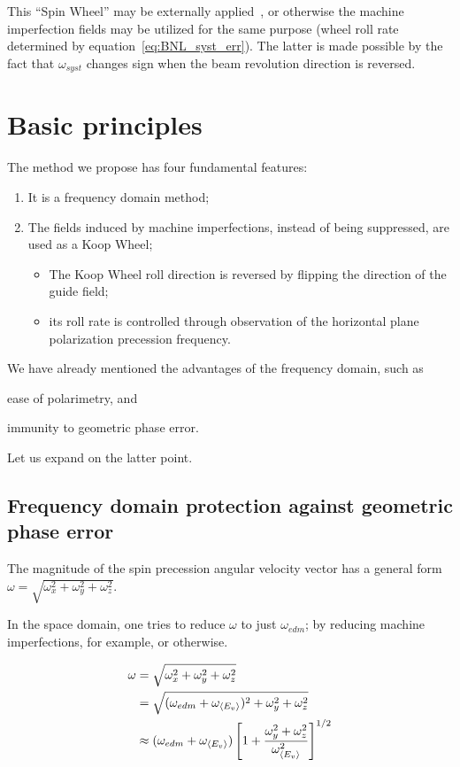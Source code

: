 \documentclass[a4paper]{jacow}
\newcommand{\w}{\omega}
\newcommand{\avg}[1]{\langle{#1}\rangle}
\newcommand{\wedm}{\w_{edm}}
\newcommand{\wimp}{\w_{\avg{E_v}}}
\begin{document}
This ``Spin Wheel'' may be externally applied~\cite{Koop:SW}, or otherwise the machine imperfection fields
may be utilized for the same purpose (wheel roll rate determined by equation~\eqref{eq:BNL_syst_err}).
The latter is made possible by the fact that $\w_{syst}$ changes sign when the beam revolution direction
is reversed.~\cite[p.~11]{BNL:Deuteron2008}

\section{Basic principles}

The method we propose has four fundamental features:
\begin{enumerate}
\item It is a frequency domain method;
\item The fields induced by machine imperfections, instead of being suppressed,
  are used as a Koop Wheel;
  \begin{itemize}
  \item The Koop Wheel roll direction is reversed by flipping the direction of the guide field;
  \item its roll rate is controlled through observation of the horizontal plane
    polarization precession frequency.
  \end{itemize}
\end{enumerate}

We have already mentioned the advantages of the frequency domain, such as
\begin{inparaenum}
\item ease of polarimetry, and
\item immunity to geometric phase error.
\end{inparaenum}
Let us expand on the latter point.

\subsection{Frequency domain protection against geometric phase error}

The magnitude of the spin precession angular velocity vector has a general form $\w = \sqrt{\w_x^2 + \w_y^2 + \w_z^2}$.

In the space domain, one tries to reduce $\w$ to just $\wedm$; by reducing machine imperfections, for example, or otherwise.


\begin{align*}
  \w &= \sqrt{\w_x^2 + \w_y^2 + \w_z^2}\\
       &= \sqrt{(\wedm + \wimp)^2 + \w_y^2 + \w_z^2}\\
     &\approx (\wedm + \wimp)\bkt*{1 + \frac{\w_y^2 + \w_z^2}{\wimp^2}}^{1/2}
\end{align*}
\end{document}
